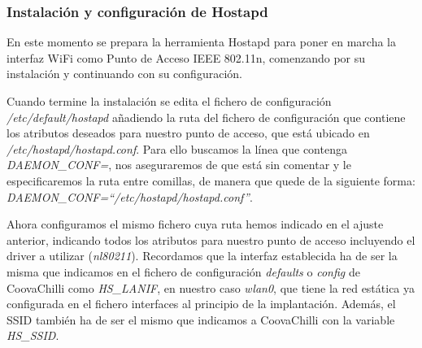 
\subsubsection{Instalación y configuración de Hostapd} \label{HostapdInstallConfig}

En este momento se prepara la herramienta Hostapd para poner en marcha la interfaz WiFi como Punto de Acceso IEEE 802.11n, comenzando por su instalación y continuando con su configuración.


Cuando termine la instalación se edita el fichero de configuración \emph{/etc/default/hostapd} añadiendo la ruta del fichero de configuración que contiene los atributos deseados para nuestro punto de acceso, que está ubicado en \emph{/etc/hostapd/hostapd.conf}. Para ello buscamos la línea que contenga \emph{DAEMON\_CONF=}, nos aseguraremos de que está sin comentar y le especificaremos la ruta entre comillas, de manera que quede de la siguiente forma: \emph{DAEMON\_CONF=``/etc/hostapd/hostapd.conf''}.

Ahora configuramos el mismo fichero cuya ruta hemos indicado en el ajuste anterior, indicando todos los atributos para nuestro punto de acceso incluyendo el driver a utilizar (\emph{nl80211}). Recordamos que la interfaz establecida ha de ser la misma que indicamos en el fichero de configuración \emph{defaults} o \emph{config} de CoovaChilli como \emph{HS\_LANIF}, en nuestro caso \emph{wlan0}, que tiene la red estática ya configurada en el fichero interfaces al principio de la implantación. Además, el SSID también ha de ser el mismo que indicamos a CoovaChilli con la variable \emph{HS\_SSID}.


